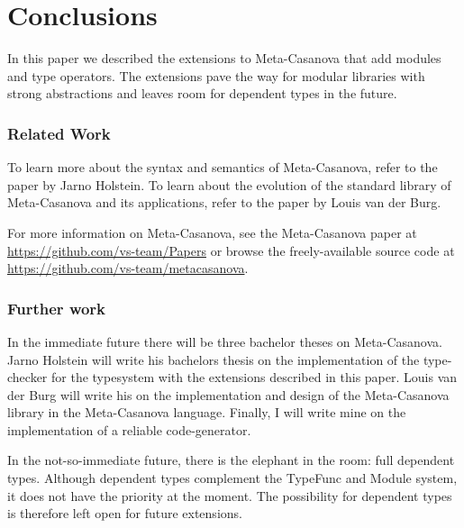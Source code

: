 \section{Conclusions}
In this paper we described the extensions to Meta-Casanova that add modules and type operators.
The extensions pave the way for modular libraries with strong abstractions and leaves room for dependent types in the future.

\subsubsection*{Related Work}
To learn more about the syntax and semantics of Meta-Casanova, refer to the paper by Jarno Holstein\cite{holstein16}.
To learn about the evolution of the standard library of Meta-Casanova and its applications, refer to the paper by Louis van der Burg\cite{vanderburg16}.

For more information on Meta-Casanova, see the Meta-Casanova paper at \url{https://github.com/vs-team/Papers} or browse the freely-available source code at \url{https://github.com/vs-team/metacasanova}.

\columnbreak
\subsubsection*{Further work}
In the immediate future there will be three bachelor theses on Meta-Casanova.
Jarno Holstein will write his bachelors thesis on the implementation of the type-checker for the typesystem with the extensions described in this paper.
Louis van der Burg will write his on the implementation and design of the Meta-Casanova library in the Meta-Casanova language.
Finally, I will write mine on the implementation of a reliable code-generator.

In the not-so-immediate future, there is the elephant in the room: full dependent types.
Although dependent types complement the TypeFunc and Module system, it does not have the priority at the moment.
The possibility for dependent types is therefore left open for future extensions.
